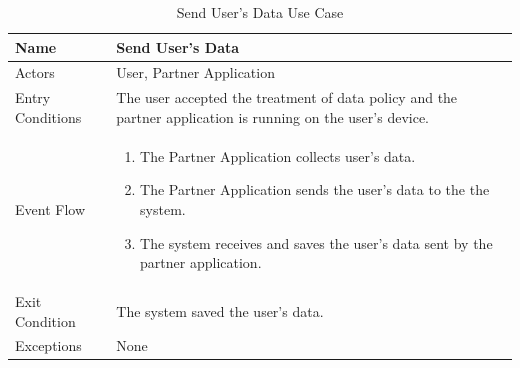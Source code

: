 \begin{enumerate}
\FloatBarrier
\begin{table}[h]
\begin{tabular}{|p{3.4cm}|p{}|}
\hline
Name             & Send User's Data\\ \hline
Actors           & User, Partner Application  \\ \hline
Entry Conditions & The user accepted the treatment of data policy and the partner application is running on the user's device.  \\ \hline
Event Flow       & \begin{enumerate}
			\item The Partner Application collects user's data.
            \item The Partner Application sends the user's data to the the system.
            \item The system receives and saves the user's data sent by the partner application.
        \end{enumerate}\\ \hline
Exit Condition   & The system saved the user's data.\\ \hline
Exceptions       & None \\ \hline
\end{tabular}
\caption{Send User's Data Use Case}
\end{table}
\clearpage
\newpage


\end{enumerate}
